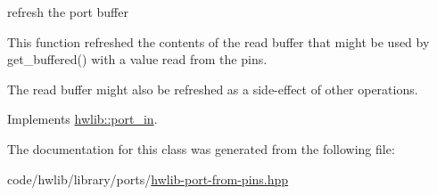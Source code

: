 refresh the port buffer

This function refreshed the contents of the read buffer that might be used by get\+\_\+buffered() with a value read from the pins.

The read buffer might also be refreshed as a side-\/effect of other operations. 

Implements \hyperlink{classhwlib_1_1port__in_a5d409eee35b766c844f7229fbe010545}{hwlib\+::port\+\_\+in}.



The documentation for this class was generated from the following file\+:\begin{DoxyCompactItemize}
\item 
code/hwlib/library/ports/\hyperlink{hwlib-port-from-pins_8hpp}{hwlib-\/port-\/from-\/pins.\+hpp}\end{DoxyCompactItemize}
